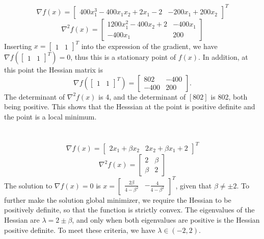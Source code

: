 \documentclass[11pt]{article}
\begin{document}
\section{}
$$\nabla f(x)=\begin{bmatrix} 400x_1^3-400x_1x_2+2x_1-2 & -200x_1+200x_2\end{bmatrix}^T$$
$$\nabla ^2f(x)=\begin{bmatrix} 1200x_1^2-400x_2+2 & -400x_1\\ -400x_1 &200\end{bmatrix} $$
Inserting $x=\begin{bmatrix} 1 & 1\end{bmatrix}^T $ into the expression of the gradient, we have $\nabla f(\begin{bmatrix} 1&1\end{bmatrix}^T )=0$, thus this is a stationary point of $f(x)$. In addition, at this point the Hessian matrix is $$\nabla f(\begin{bmatrix} 1 & 1\end{bmatrix}^T ) = \begin{bmatrix} 802 & -400 \\ -400 & 200\end{bmatrix} .$$ The determinant of $\nabla ^2f(x)$ is 4, and the determinant of $[802]$ is 802, both being positive. This shows that the Hesssian at the point is positive definite and the point is a local minimum. 
\section{}
$$\nabla f(x)=\begin{bmatrix}2x_1+\beta x_2 & 2x_2+\beta x_1+2\end{bmatrix}^T$$ $$\nabla^2f(x)=\begin{bmatrix}2 & \beta \\ \beta & 2 \end{bmatrix}$$
The solution to $\nabla f(x)=0$ is $x=\begin{bmatrix} \frac{2\beta}{4-\beta^2} & -\frac{4}{4-\beta^2} \end{bmatrix}^T$, given that $\beta\neq\pm2$. To further make the solution global minimizer, we require the Hessian to be positively definite, so that the function is strictly convex. The eigenvalues of the Hessian are $\lambda=2\pm\beta$, and only when both eigenvalues are positive is the Hessian positive definite. To meet these criteria, we have $\lambda\in(-2,2)$.
\section{}
\end{document}
